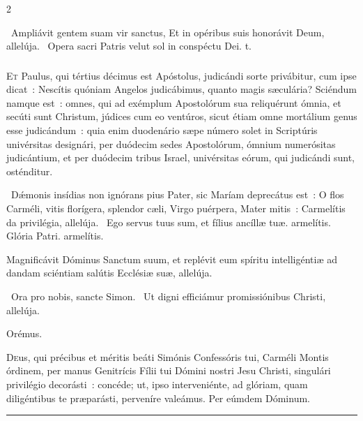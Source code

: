 \documentclass[9pt,twoside]{extarticle}
\begin{document}
\begin{multicols}{2}
{\begin{tightlist}{}
\item {}~Ampliávit gentem suam vir sanctus, \textred{*} Et in opéribus suis honorávit Deum, allelúja. ~Opera sacri Patris velut sol in conspéctu Dei. t.
\end{tightlist}

\subsubsection*{\center {}}
\lettrine{E}t Paulus, qui tértius décimus est Apóstolus, judicándi sorte privábitur, cum ipse dicat~: Nescítis quóniam Angelos judicábimus, quanto magis sæculária? Sciéndum namque est~: omnes, qui ad exémplum Apostolórum sua reliquérunt ómnia, et secúti sunt Christum, júdices cum eo ventúros, sicut étiam omne mortálium genus esse judicándum~: quia enim duodenário sæpe número solet in Scriptúris univérsitas designári, per duódecim sedes Apostolórum, ómnium numerósitas judicántium, et per duódecim tribus Israel, univérsitas eórum, qui judicándi sunt, osténditur.

\begin{tightlist}{}
\item {}~Dǽmonis insídias non ignórans pius Pater, sic Maríam deprecátus est~: O flos Carméli, vitis florígera, splendor cæli, Virgo puérpera, Mater mitis~: \textred{*} Carmelítis da privilégia, allelúja. ~Ego servus tuus sum, et fílius ancíllæ tuæ. armelítis. Glória Patri. armelítis.
\item {}
\item {} Magnificávit Dóminus Sanctum suum, et replévit eum spíritu intelligéntiæ ad dandam sciéntiam salútis Ecclésiæ suæ, allelúja.
\item {}~Ora pro nobis, sancte Simon. ~Ut digni efficiámur promissiónibus Christi, allelúja.
\item Orémus. \hfill {}
\end{tightlist}
\lettrine{D}eus, qui précibus et méritis beáti Simónis Confessóris tui, Carméli Montis órdinem, per manus Genitrícis Fílii tui Dómini nostri Jesu Christi, singulári privilégio decorásti~: concéde; ut, ipso interveniénte, ad glóriam, quam diligéntibus te præparásti, perveníre valeámus. Per eúmdem Dóminum.

\begin{center}\textcolor{red}{\rule{\linewidth}{0.5pt}} \end{center}

}
\end{multicols}
\end{document}
